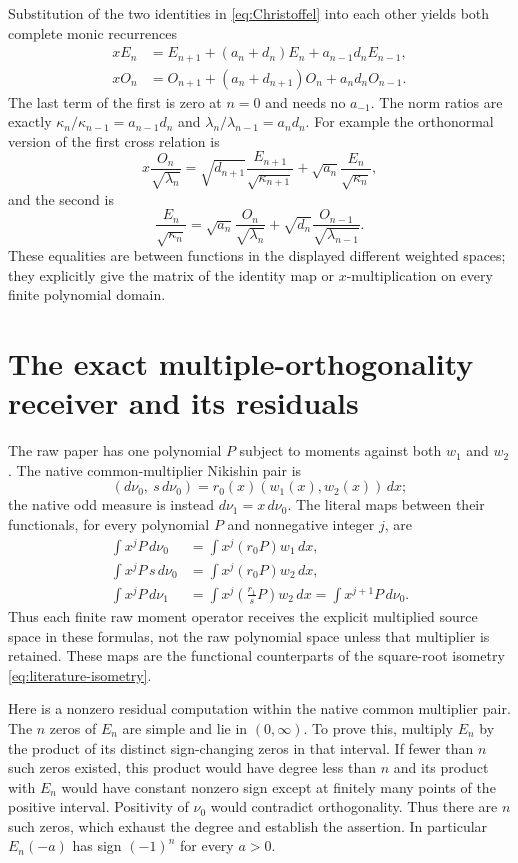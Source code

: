 \documentclass[11pt]{article}
\begin{document}
Substitution of the two identities in \eqref{eq:Christoffel} into
each other yields both complete monic recurrences
\begin{align}
 xE_n&=E_{n+1}+(a_n+d_n)E_n+a_{n-1}d_nE_{n-1},\label{eq:E-rec}\\
 xO_n&=O_{n+1}+(a_n+d_{n+1})O_n+a_nd_nO_{n-1}.\label{eq:O-rec}
\end{align}
The last term of the first is zero at $n=0$ and needs no $a_{-1}$.
The norm ratios are exactly
$\kappa_n/\kappa_{n-1}=a_{n-1}d_n$ and
$\lambda_n/\lambda_{n-1}=a_nd_n$.
For example the orthonormal version of the first cross relation is
\[
 x\frac{O_n}{\sqrt{\lambda_n}}
  =\sqrt{d_{n+1}}\frac{E_{n+1}}{\sqrt{\kappa_{n+1}}}
       +\sqrt{a_n}\frac{E_n}{\sqrt{\kappa_n}},
\]
and the second is
\[
 \frac{E_n}{\sqrt{\kappa_n}}
 =\sqrt{a_n}\frac{O_n}{\sqrt{\lambda_n}}
       +\sqrt{d_n}\frac{O_{n-1}}{\sqrt{\lambda_{n-1}}}.
\]
These equalities are between functions in the displayed different
weighted spaces; they explicitly give the matrix of the identity
map or $x$-multiplication on every finite polynomial domain.

\section{The exact multiple-orthogonality receiver and its residuals}

The raw paper has one polynomial $P$ subject to moments against
both $w_1$ and $w_2$. The native common-multiplier Nikishin pair is
\[
 (d\nu_0,\ s\,d\nu_0)=r_0(x)(w_1(x),w_2(x))\,dx;
\]
the native odd measure is instead $d\nu_1=x\,d\nu_0$.
The literal maps between their functionals, for every polynomial
$P$ and nonnegative integer $j$, are
\begin{align}
 \int x^jP\,d\nu_0&=\int x^j(r_0P)w_1\,dx,\label{eq:functional0}\\
 \int x^jP\,s\,d\nu_0&=\int x^j(r_0P)w_2\,dx,\label{eq:functionalS}\\
 \int x^jP\,d\nu_1&=\int x^j\left(\frac{r_1}{s}P\right)w_2\,dx
                    =\int x^{j+1}P\,d\nu_0.\label{eq:functional1}
\end{align}
Thus each finite raw moment operator receives the explicit
multiplied source space in these formulas, not the raw polynomial
space unless that multiplier is retained. These maps are the
functional counterparts of the square-root isometry
\eqref{eq:literature-isometry}.

Here is a nonzero residual computation within the native common
multiplier pair. The $n$ zeros of $E_n$ are simple and lie in
$(0,\infty)$. To prove this, multiply $E_n$ by the product of its
distinct sign-changing zeros in that interval. If fewer than $n$
such zeros existed, this product would have degree less than $n$
and its product with $E_n$ would have constant nonzero sign except
at finitely many points of the positive interval. Positivity of
$\nu_0$ would contradict orthogonality. Thus there are $n$ such
zeros, which exhaust the degree and establish the assertion.
In particular $E_n(-a)$ has sign $(-1)^n$ for every $a>0$.
\end{document}
